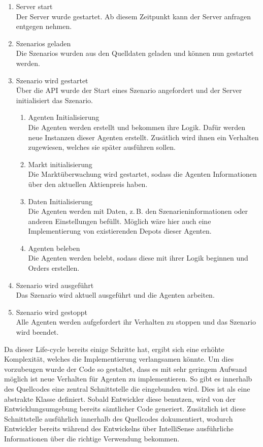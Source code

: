 \begin{enumerate}
    \item Server start\\
        Der Server wurde gestartet. Ab diesem Zeitpunkt kann der Server anfragen entgegen nehmen.
    \item Szenarios geladen\\
        Die Szenarios wurden aus den Quelldaten geladen und können nun gestartet werden.
    \item Szenario wird gestartet\\
        Über die \ac{API} wurde der Start eines Szenario angefordert und der Server initialisiert das Szenario.
        \begin{enumerate}
            \item Agenten Initialisierung\\
                Die Agenten werden erstellt und bekommen ihre Logik. Dafür werden neue Instanzen dieser Agenten erstellt. Zusätlich wird ihnen ein Verhalten zugewiesen, welches sie später ausführen sollen.
            \item Markt initialisierung\\
                Die Marktüberwachung wird gestartet, sodass die Agenten Informationen über den aktuellen Aktienpreis haben.
            \item Daten Initialisierung\\
                Die Agenten werden mit Daten, z.\,B. den Szenarieninformationen oder anderen Einstellungen befüllt.
                Möglich wäre hier auch eine Implementierung von existierenden Depots dieser Agenten.
            \item Agenten beleben\\
                Die Agenten werden belebt, sodass diese mit ihrer Logik beginnen und Orders erstellen.
        \end{enumerate}
    \item Szenario wird ausgeführt\\
        Das Szenario wird aktuell ausgeführt und die Agenten arbeiten.
    \item Szenario wird gestoppt\\
        Alle Agenten werden aufgefordert ihr Verhalten zu stoppen und das Szenario wird beendet.
\end{enumerate}


Da dieser Life-cycle bereits einige Schritte hat, ergibt sich eine erhöhte Komplexität, welches die Implementierung verlangsamen könnte.
Um dies vorzubeugen wurde der Code so gestaltet, dass es mit sehr geringem Aufwand möglich ist neue Verhalten für Agenten zu implementieren. So gibt es innerhalb des Quellcodes eine zentral Schnittstelle die eingebunden wird. Dies ist als eine abstrakte Klasse definiert. Sobald Entwickler diese benutzen, wird von der Entwicklungsumgebung bereits sämtlicher Code generiert. Zusätzlich ist diese Schnittstelle ausführlich innerhalb des Quellcodes dokumentiert, wodurch Entwickler bereits während des Entwickelns über IntelliSense ausführliche Informationen über die richtige Verwendung bekommen.


